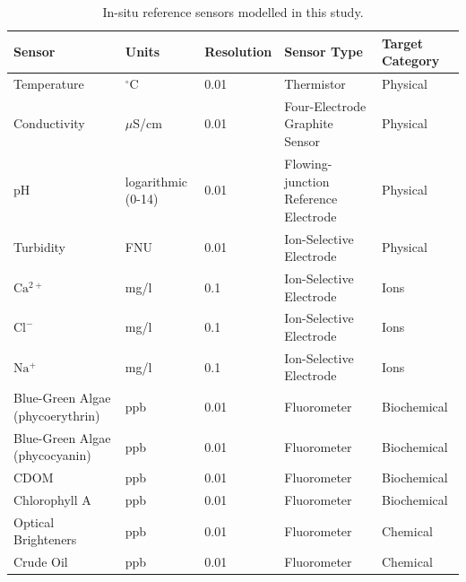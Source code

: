 \documentclass[remotesensing,article,submit,pdftex,moreauthors]{Definitions/mdpi}
\begin{document}
\begin{table}[H] 
\caption{In-situ reference sensors modelled in this study.\label{tab:sensors}}
\begin{tabularx}{\textwidth}{CCCCC}
\toprule
\textbf{Sensor}	& \textbf{Units} & Resolution & \textbf{Sensor Type} & \textbf{Target Category}\\
\midrule
Temperature		                    & $^{\circ}$C        & 0.01  & Thermistor                           & Physical \\
Conductivity                        & $\mu$S/cm          & 0.01  & Four-Electrode Graphite Sensor       & Physical  \\
pH                                  & logarithmic (0-14) & 0.01  & Flowing-junction Reference Electrode & Physical \\
Turbidity                           & FNU                & 0.01  & Ion-Selective Electrode              & Physical \\
$\mathrm{Ca^{2+}}$                  & mg/l               & 0.1   & Ion-Selective Electrode              & Ions \\
$\mathrm{Cl^-}$                     & mg/l               & 0.1   & Ion-Selective Electrode              & Ions \\
$\mathrm{Na^+}$                     & mg/l               & 0.1   & Ion-Selective Electrode              & Ions \\
Blue-Green Algae (phycoerythrin)    & ppb                & 0.01  & Fluorometer                          & Biochemical \\
Blue-Green Algae (phycocyanin)      & ppb                & 0.01  & Fluorometer                          & Biochemical \\
CDOM                                & ppb                & 0.01  & Fluorometer                          & Biochemical \\
Chlorophyll A                       & ppb                & 0.01  & Fluorometer                          & Biochemical \\
Optical Brighteners                 & ppb                & 0.01  & Fluorometer                          & Chemical \\
Crude Oil                           & ppb                & 0.01  & Fluorometer                          & Chemical\\
\bottomrule
\end{tabularx}
\end{table}
\end{document}
